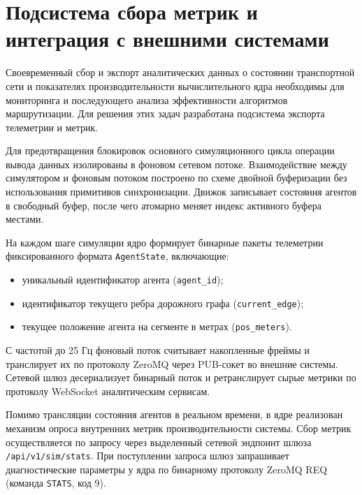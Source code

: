 \section{Подсистема сбора метрик и интеграция с внешними системами}

Своевременный сбор и экспорт аналитических данных о состоянии транспортной сети и показателях производительности вычислительного ядра необходимы для мониторинга и последующего анализа эффективности алгоритмов маршрутизации. Для решения этих задач разработана подсистема экспорта телеметрии и метрик.

Для предотвращения блокировок основного симуляционного цикла операции вывода данных изолированы в фоновом сетевом потоке. Взаимодействие между симулятором и фоновым потоком построено по схеме двойной буферизации без использования примитивов синхронизации. Движок записывает состояния агентов в свободный буфер, после чего атомарно меняет индекс активного буфера местами.

На каждом шаге симуляции ядро формирует бинарные пакеты телеметрии фиксированного формата \texttt{AgentState}, включающие:
\begin{itemize}
    \item уникальный идентификатор агента (\texttt{agent\_id});
    \item идентификатор текущего ребра дорожного графа (\texttt{current\_edge});
    \item текущее положение агента на сегменте в метрах (\texttt{pos\_meters}).
\end{itemize}

С частотой до 25 Гц фоновый поток считывает накопленные фреймы и транслирует их по протоколу ZeroMQ через PUB-сокет во внешние системы. Сетевой шлюз десериализует бинарный поток и ретранслирует сырые метрики по протоколу WebSocket аналитическим сервисам.

Помимо трансляции состояния агентов в реальном времени, в ядре реализован механизм опроса внутренних метрик производительности системы. Сбор метрик осуществляется по запросу через выделенный сетевой эндпоинт шлюза \texttt{/api/v1/sim/stats}. При поступлении запроса шлюз запрашивает диагностические параметры у ядра по бинарному протоколу ZeroMQ REQ (команда \texttt{STATS}, код 9).

